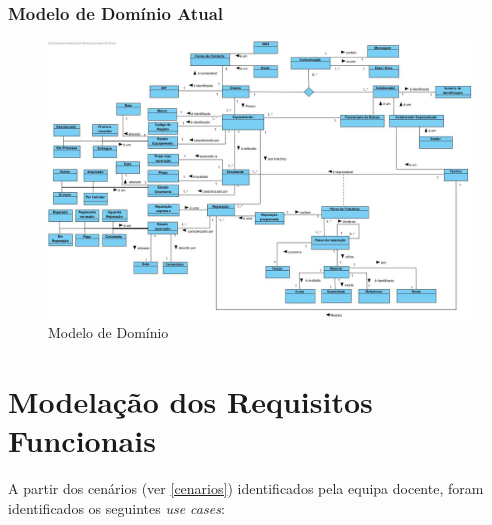 \documentclass[a4paper,12pt]{scrreprt}
\begin{document}
\subsection{Modelo de Domínio Atual}

\begin{figure}[!ht]
    \centering
    \includegraphics[scale=0.30]{ModeloDominio.jpg}
    \caption{Modelo de Domínio}
\end{figure}

\chapter{Modelação dos Requisitos Funcionais} \label{modelacao_req_funcionais}

A partir dos cenários (ver \ref{cenarios}) identificados pela equipa docente, 
foram identificados os seguintes \textit{use cases}:
\end{document}
